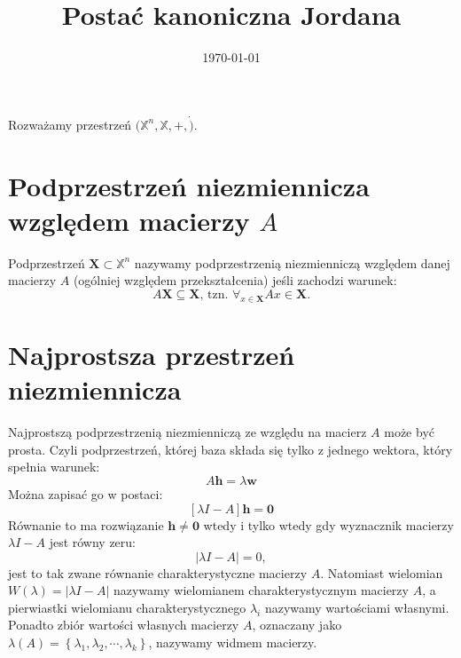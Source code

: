 \documentclass{article}
\title{Postać kanoniczna Jordana}
\date{\today}
\begin{document}
\maketitle

Rozważamy przestrzeń $(\mathbb{X}^{n}, \mathbb{X}, +, \dot)$.%

\section{Podprzestrzeń niezmiennicza względem macierzy $A$}
Podprzestrzeń $\mathbf{X} \subset \mathbb{X}^{n}$ nazywamy podprzestrzenią niezmienniczą względem danej macierzy $A$ (ogólniej względem przekształcenia) jeśli zachodzi warunek:
$$
    A\mathbf{X} \subseteq \mathbf{X},\, \text{tzn. } \forall_{x \in \mathbf{X}}{Ax \in \mathbf{X}}.
$$

\section{Najprostsza przestrzeń niezmiennicza}
Najprostszą podprzestrzenią niezmienniczą ze względu na macierz $A$ może być prosta.
Czyli podprzestrzeń, której baza składa się tylko z jednego wektora, który spełnia warunek:
$$
    A\mathbf{h} = \lambda\mathbf{w}
$$
Można zapisać go w postaci:
$$
    \left[ \lambda I -A \right]\mathbf{h} = \mathbf{0}
$$
Równanie to ma rozwiązanie $\mathbf{h} \neq \mathbf{0}$ wtedy i tylko wtedy gdy wyznacznik macierzy $\lambda I -A$ jest równy zeru:
$$
    |\lambda I -A| = 0,
$$
jest to tak zwane równanie charakterystyczne macierzy $A$.
Natomiast wielomian $W(\lambda) = |\lambda I -A|$ nazywamy wielomianem charakterystycznym macierzy $A$, a pierwiastki wielomianu charakterystycznego $\lambda_{i}$ nazywamy wartościami własnymi.
Ponadto zbiór wartości własnych macierzy $A$, oznaczany jako $\lambda(A) = \left\{ \lambda_{1}, \lambda_{2}, \cdots, \lambda_{k} \right\}$, nazywamy widmem macierzy.

\end{document}
